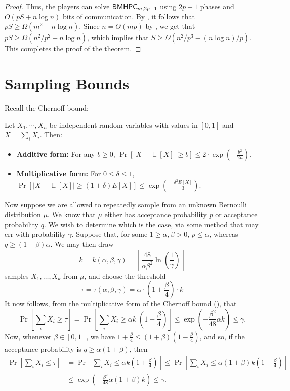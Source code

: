 \documentclass[11pt,letterpaper]{article}
\DeclareMathOperator*{\E}{\mathbb{E}}
\renewcommand{\geq}{\geqslant}
\renewcommand{\leq}{\leqslant}
\renewcommand{\le}{\leq}
\renewcommand{\ge}{\geq}
\theoremstyle{definition}
\newcommand{\bmhpc}{\ensuremath{\textnormal{\textsf{BMHPC}}}\xspace}
\begin{document}
\begin{proof}
Thus, the players can solve $\bmhpc_{m,2p-1}$ using $2p-1$ phases and $O(pS+n\log n)$ bits of communication. By , it follows that $pS\geq \Omega(m^2- n\log n)$. Since $n=\Theta(mp)$ by , we get that $pS\geq \Omega(n^2/p^2 - n\log n)$, which implies that $S\geq \Omega(n^2/p^3 - (n\log n)/p)$. This completes the proof of the theorem.  \end{proof}

\appendix

\section{Sampling Bounds}\label{sec:sampling}

Recall the Chernoff bound:


\begin{proposition}\label{lem:chernoff}
    Let $X_1, \cdots, X_n$ be independent random variables with values in $[0,1]$ and $X = \sum_i X_i$. Then: \begin{itemize}
        \item \textbf{Additive form: } For any $b \ge 0$, $\Pr[|X - \E[X]| \ge b] \le 2\cdot \exp\left(-\frac{b^2}{2n}\right)$, \label{itm:chernoff-add}

        \item \textbf{Multiplicative form: } For $0 \le \delta \le 1$, $\Pr[|X - \E[X]| \ge (1+\delta) E[X]] \le \exp\left(-\frac{\delta^2 E[X]}{3}\right)$.\label{itm:chernoff-mult}
    \end{itemize}
\end{proposition}

\bigskip\noindent
Now suppose we are allowed to repeatedly sample from an unknown Bernoulli distribution $\mu$. We know that $\mu$ either has acceptance probability $p$ or acceptance probability $q$. We wish to determine which is the case, via some method that may err with probability $\gamma$. Suppose that, for some $1 \ge \alpha,\beta > 0$, $p \le \alpha$, whereas $q \ge (1 + \beta) \alpha$. We may then draw 
\[
k = k(\alpha, \beta, \gamma) = \left\lceil\frac{48}{\alpha \beta^2} \ln\left(\frac{1}{\gamma}\right)\right\rceil
\]
samples $X_1, \ldots, X_k$ from $\mu$, and choose the threshold
\[
\tau = \tau(\alpha, \beta, \gamma) = \alpha \cdot \left(1 + \frac{\beta}{4}\right) \cdot k 
\]
It now follows, from the multiplicative form of the Chernoff bound (), that
\[
\Pr[\sum_i X_i \ge \tau] = \Pr[\sum_i X_i \ge \alpha k \;\left(1 + \frac\beta4\right)] \le \exp\left(- \frac{\beta^2}{48} \alpha k \right) \le \gamma.
\]
Now, whenever $\beta \in [0,1]$, we have $1 + \frac\beta4 \le (1 + \beta) ( 1 - \frac{\beta}{4})$, and so, if the acceptance probability is $q \ge \alpha(1 + \beta)$, then
\begin{align*}
\Pr[\sum_i X_i \le \tau] %
& = \Pr[\sum_i X_i \le \alpha k\left(1 + \frac\beta4\right)] \le \Pr[\sum_i X_i \le \alpha (1 + \beta) k\left(1 - \frac\beta4\right)] \\
& \le \exp\left(- \frac{\beta^2}{48} \alpha (1+\beta) k \right) \le \gamma.
\end{align*}
\end{document}
